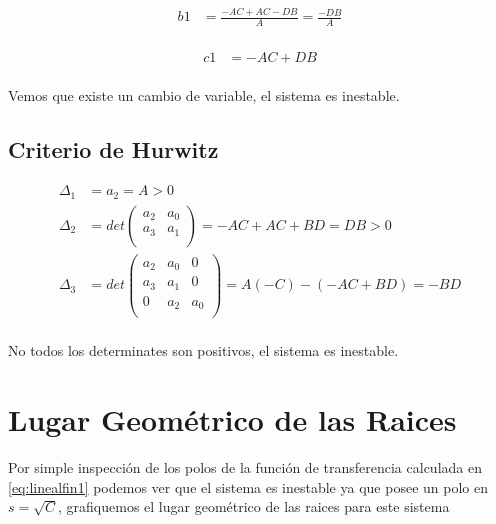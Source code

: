 \documentclass[a4paper]{IEEEtran} %
\begin{document}
\begin{equation}
    \begin{split}
        b1&=\frac{-AC+AC-DB}{A}=\frac{-DB}{A}\\
    \end{split}
    \label{eq:routh1}
\end{equation}

\begin{equation}
    \begin{split}
        c1&=-AC+DB\\
    \end{split}
    \label{eq:routh1}
\end{equation}

Vemos que existe un cambio de variable, el sistema es inestable.

\subsection{Criterio de Hurwitz}

\begin{equation}
    \begin{split}
        \Delta_1&=a_2=A>0\\
        \Delta_2&=det(
        \begin{matrix}
            a_2 & a_0 \\
            a_3 & a_1 \\
        \end{matrix})=
        -AC+AC+BD=DB>0\\
        \Delta_3&=det(
        \begin{matrix}
            a_2 & a_0 & 0 \\
            a_3 & a_1 & 0 \\
            0 & a_2 & a_0 \\
        \end{matrix})=A(-C)-(-AC+BD)=-BD\\
    \end{split}
    \label{eq:hurwitz}
\end{equation}

No todos los determinates son positivos, el sistema es 
inestable.

\section{Lugar Geométrico de las Raices}
Por simple inspección de los polos de la función de transferencia calculada en \ref{eq:linealfin1} podemos ver que el sistema es inestable ya que posee un polo en $s=\sqrt{C}$, grafiquemos el lugar geométrico de las raices para este sistema
\end{document}
